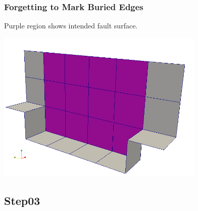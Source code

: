 \documentclass[aspectration=169]{beamer}
\begin{document}
\begin{frame}
  \frametitle{Forgetting to Mark Buried Edges}

  Purple region shows intended fault surface.
  \begin{center}
    \includegraphics[height=7.2cm]{figs/faultedges}
  \end{center}
  
\end{frame}


\subsection{Step03}
\end{document}
